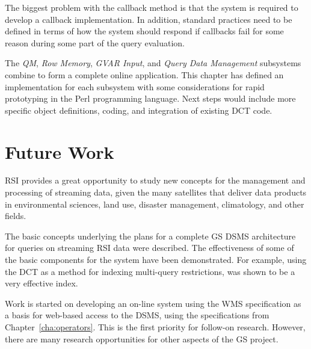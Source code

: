 \documentclass{ucdthesis}       %
\begin{document}
The biggest problem with the callback method is that the system is
required to develop a callback implementation.  In addition, standard
practices need to be defined in terms of how the system should respond
if callbacks fail for some reason during some part of the query
evaluation.


The \emph{\acl{QM}}, \emph{Row Memory}, \emph{\ac{GVAR} Input}, and
\emph{Query Data Management} subsystems combine to form a complete
online application.  This chapter has defined an implementation for
each subsystem with some considerations for rapid prototyping in the
Perl programming language.  Next steps would include more specific
object definitions, coding, and integration of existing \ac{DCT} code.


\chapter{Future Work}
\label{cha:conclusions}

\acl{RSI} provides a great opportunity to study new concepts for the
management and processing of streaming data, given the many satellites
that deliver data products in environmental sciences, land use,
disaster management, climatology, and other fields.

The basic concepts underlying the plans for a complete \ac{GS}
\ac{DSMS} architecture for queries on streaming \ac{RSI} data were
described.  The effectiveness of some of the basic components for the
system have been demonstrated.  For example, using the \ac{DCT} as a
method for indexing multi-query restrictions, was shown to be a very
effective index.

Work is started on developing an on-line system using the \ac{WMS}
specification as a basis for web-based access to the \ac{DSMS}, using
the specifications from Chapter~\ref{cha:operators}.  This is the
first priority for follow-on research.  However, there are many
research opportunities for other aspects of the \ac{GS} project.
\end{document}
